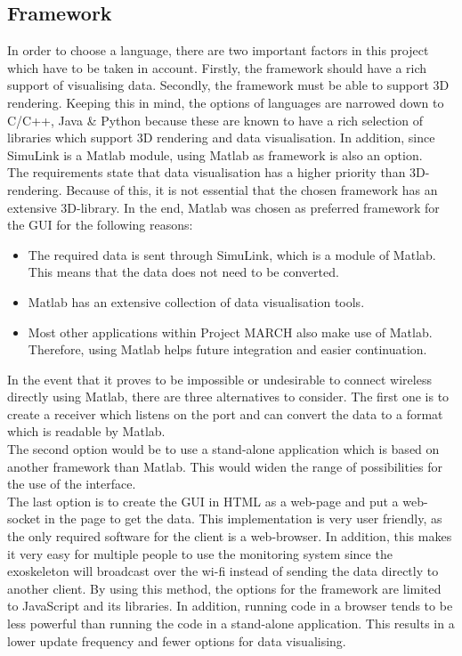 \subsection{Framework}
In order to choose a language, there are two important factors in this project which have to be taken in account. Firstly, the framework should have a rich support of visualising data. Secondly, the framework must be able to support 3D rendering. Keeping this in mind, the options of languages are narrowed down to C/C++, Java \& Python because these are known to have a rich selection of libraries which support 3D rendering and data visualisation. In addition, since SimuLink is a Matlab module, using Matlab as framework is also an option. \\
The requirements state that data visualisation has a higher priority than 3D-rendering. Because of this, it is not essential that the chosen framework has an extensive 3D-library. In the end, Matlab was chosen as preferred framework for the GUI for the following reasons:
\begin{itemize}
	\item The required data is sent through SimuLink, which is a module of Matlab. This means that the data does not need to be converted.
	\item Matlab has an extensive collection of data visualisation tools.
	\item Most other applications within Project MARCH also make use of Matlab. Therefore, using Matlab helps future integration and easier continuation.
\end{itemize}
In the event that it proves to be impossible or undesirable to connect wireless directly using Matlab, there are three alternatives to consider. The first one is to create a receiver which listens on the port and can convert the data to a format which is readable by Matlab.
\\The second option would be to use a stand-alone application which is based on another framework than Matlab. This would widen the range of possibilities for the use of the interface.
\\The last option is to create the GUI in HTML as a web-page and put a web-socket in the page to get the data. This implementation is very user friendly, as the only required software for the client is a web-browser. In addition, this makes it very easy for multiple people to use the monitoring system since the exoskeleton will broadcast over the wi-fi instead of sending the data directly to another client. By using this method, the options for the framework are limited to JavaScript and its libraries. In addition, running code in a browser tends to be less powerful than running the code in a stand-alone application. This results in a lower update frequency and fewer options for data visualising.

